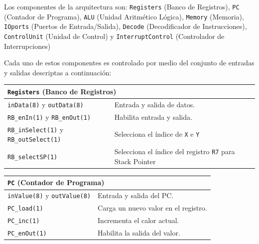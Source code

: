 \documentclass[a4paper,11pt]{article}
\begin{document}
Los componentes de la arquitectura son: 
\texttt{Registers} (Banco de Registros),
\texttt{PC} (Contador de Programa),
\texttt{ALU} (Unidad Aritmético Lógica),
\texttt{Memory} (Memoria),
\texttt{IOports} (Puertos de Entrada/Salida),
\texttt{Decode} (Decodificador de Instrucciones),
\texttt{ControlUnit} (Unidad de Control) y
\texttt{InterruptControl} (Controlador de Interrupciones)

Cada uno de estos componentes es controlado por medio del conjunto de entradas y salidas descriptas a continuación:

\small

\begin{center}
\begin{tabular}{p{6.4cm}|p{8.2cm}}
\multicolumn{2}{l}{ \texttt{Registers} (Banco de Registros) }\\ %
\hline
\texttt{inData(8)} y \texttt{outData(8)}             & Entrada y salida de datos.\\
\texttt{RB\_enIn(1)} y \texttt{RB\_enOut(1)}         & Habilita entrada y salida.\\
\texttt{RB\_inSelect(1)} y \texttt{RB\_outSelect(1)} & Selecciona el índice de \texttt{X} e \texttt{Y}\\
\texttt{RB\_selectSP(1)}                             & Selecciona el índice del registro \texttt{R7} para Stack Pointer\\
\end{tabular}
\end{center}

\begin{center}
\begin{tabular}{p{6.4cm}|p{8.2cm}}
\multicolumn{2}{l}{ \texttt{PC} (Contador de Programa) }\\ %
\hline                                      
\texttt{inValue(8)} y \texttt{outValue(8)}  & Entrada y salida del PC.\\
\texttt{PC\_load(1)}                        & Carga un nuevo valor en el registro.\\
\texttt{PC\_inc(1)}                         & Incrementa el calor actual.\\
\texttt{PC\_enOut(1)}                       & Habilita la salida del valor.\\
\end{tabular}
\end{center}
\end{document}
